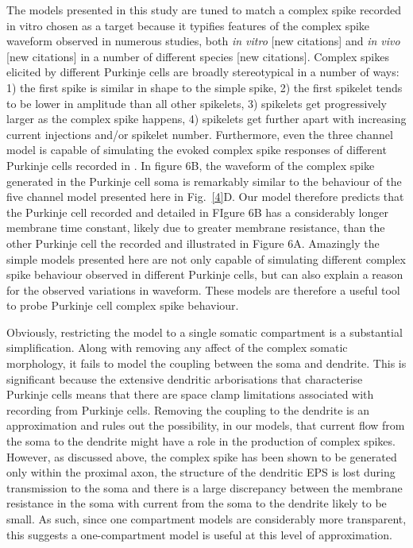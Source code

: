 \documentclass[utf8]{frontiersSCNS} %
\begin{document}
The models presented in this study are tuned to match a complex spike
recorded in vitro \cite{DavieEtAl2008} chosen as a target because it
typifies features of the complex spike waveform observed in numerous
studies, both \textsl{in vitro} [new citations] and \textsl{in vivo}
[new citations] in a number of different species [new
  citations]. Complex spikes elicited by different Purkinje cells are
broadly stereotypical in a number of ways: 1) the first spike is
similar in shape to the simple spike, 2) the first spikelet tends to
be lower in amplitude than all other spikelets, 3) spikelets get
progressively larger as the complex spike happens, 4) spikelets get
further apart with increasing current injections and/or spikelet
number. Furthermore, even the three channel model is capable of
simulating the evoked complex spike responses of different Purkinje
cells recorded in \cite{MonsivaisEtAl2005}. In figure 6B, the waveform
of the complex spike generated in the Purkinje cell soma is remarkably
similar to the behaviour of the five channel model presented here in
Fig.~\ref{4}D. Our model therefore predicts that the Purkinje cell
recorded \cite{MonsivaisEtAl2005} and detailed in FIgure 6B has a
considerably longer membrane time constant, likely due to greater
membrane resistance, than the other Purkinje cell the recorded and
illustrated in Figure 6A. Amazingly the simple models presented here
are not only capable of simulating different complex spike behaviour
observed in different Purkinje cells, but can also explain a reason
for the observed variations in waveform. These models are therefore a
useful tool to probe Purkinje cell complex spike behaviour.

Obviously, restricting the model to a single somatic compartment is a substantial simplification. Along with removing any affect of the complex somatic morphology, it fails to model the coupling between the soma and dendrite. This is significant because the extensive dendritic arborisations that characterise Purkinje cells means that there are space clamp limitations associated with recording from Purkinje cells. Removing the coupling to the dendrite is an approximation and rules out the possibility, in our models, that current flow from the soma to the dendrite might have a role in the production of complex spikes. However, as discussed above, the complex spike has been shown to be generated only within the proximal axon, the structure of the dendritic EPS is lost during transmission to the soma and there is a large discrepancy between the membrane resistance in the soma with current from the soma to the dendrite likely to be small. As such, since one compartment models are considerably more transparent, this suggests a one-compartment model is useful at this level of approximation.
\end{document}
